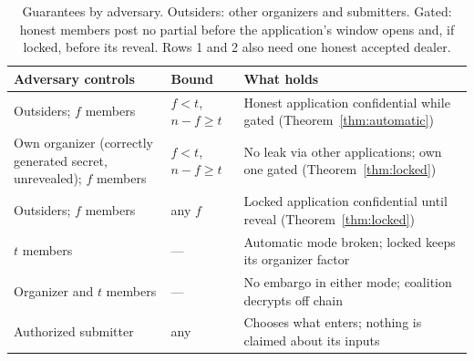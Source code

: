 \begin{table}[tb]
\centering
\caption{Guarantees by adversary. Outsiders: other organizers and submitters. Gated: honest members post no partial before the application's window opens and, if locked, before its reveal. Rows 1 and 2 also need one honest accepted dealer.}
\label{tab:threat}
\scriptsize
\setlength{\tabcolsep}{3pt}
\renewcommand{\arraystretch}{1.1}
\begin{tabular}{@{}>{\raggedright\arraybackslash}p{3.3cm}>{\raggedright\arraybackslash}p{1.2cm}>{\raggedright\arraybackslash}p{7.25cm}@{}}
\hline
Adversary controls & Bound & What holds \\
\hline
Outsiders; $f$ members & $f < t$, $n - f \ge t$ & Honest application confidential while gated (Theorem~\ref{thm:automatic}) \\
Own organizer (correctly generated secret, unrevealed); $f$ members & $f < t$, $n - f \ge t$ & No leak via other applications; own one gated (Theorem~\ref{thm:locked}) \\
Outsiders; $f$ members & any $f$ & Locked application confidential until reveal (Theorem~\ref{thm:locked}) \\
$t$ members & --- & Automatic mode broken; locked keeps its organizer factor \\
Organizer and $t$ members & --- & No embargo in either mode; coalition decrypts off chain \\
Authorized submitter & any & Chooses what enters; nothing is claimed about its inputs \\
\hline
\end{tabular}
\end{table}
